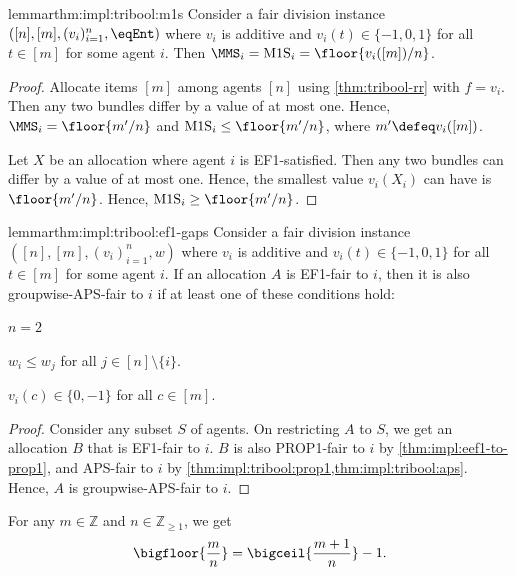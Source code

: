 \begin{restatable}{lemma}{rthm:impl:tribool:m1s}
\label{thm:impl:tribool:m1s}
Consider a fair division instance $([n], [m], (v_i)_{i=1}^n, \eqEnt)$
where $v_i$ is additive and $v_i(t) \in \{-1, 0, 1\}$ for all $t \in [m]$ for some agent $i$.
Then $\MMS_i = \mathrm{M1S}_i = \floor{v_i([m])/n}$.
\end{restatable}
\begin{proof}
Allocate items $[m]$ among agents $[n]$ using \cref{thm:tribool-rr} with $f = v_i$.
Then any two bundles differ by a value of at most one.
Hence, $\MMS_i = \floor{m'/n}$ and $\mathrm{M1S}_i \le \floor{m'/n}$,
where $m' \defeq v_i([m])$.

Let $X$ be an allocation where agent $i$ is EF1-satisfied.
Then any two bundles can differ by a value of at most one.
Hence, the smallest value $v_i(X_i)$ can have is $\floor{m'/n}$.
Hence, $\mathrm{M1S}_i \ge \floor{m'/n}$.
\end{proof}

\begin{restatable}{lemma}{rthm:impl:tribool:ef1-gaps}
\label{thm:impl:tribool:ef1-gaps}
Consider a fair division instance $([n], [m], (v_i)_{i=1}^n, w)$ where
$v_i$ is additive and $v_i(t) \in \{-1, 0, 1\}$ for all $t \in [m]$ for some agent $i$.
If an allocation $A$ is EF1-fair to $i$, then it is also groupwise-APS-fair to $i$
if at least one of these conditions hold:
\begin{tightenum}
\item $n=2$
\item $w_i \le w_j$ for all $j \in [n] \setminus \{i\}$.
\item $v_i(c) \in \{0, -1\}$ for all $c \in [m]$.
\end{tightenum}
\end{restatable}
\begin{proof}
Consider any subset $S$ of agents.
On restricting $A$ to $S$, we get an allocation $B$ that is EF1-fair to $i$.
$B$ is also PROP1-fair to $i$ by \cref{thm:impl:eef1-to-prop1},
and APS-fair to $i$ by \cref{thm:impl:tribool:prop1,thm:impl:tribool:aps}.
Hence, $A$ is groupwise-APS-fair to $i$.
\end{proof}

\begin{remark}
\label{thm:ceil-floor}
For any $m \in \mathbb{Z}$ and $n \in \mathbb{Z}_{\ge 1}$, we get
\[ \bigfloor{\frac{m}{n}} = \bigceil{\frac{m+1}{n}} - 1. \]
\end{remark}

